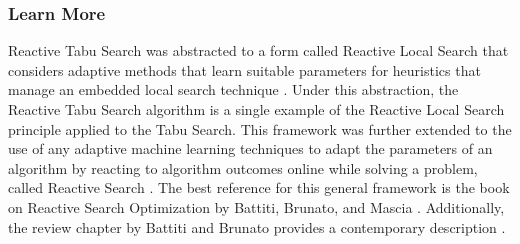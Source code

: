 % 
% 
\subsubsection{Learn More}
Reactive Tabu Search was abstracted to a form called Reactive Local Search that considers adaptive methods that learn suitable parameters for heuristics that manage an embedded local search technique \cite{Battiti1995, Battiti2001}. Under this abstraction, the Reactive Tabu Search algorithm is a single example of the Reactive Local Search principle applied to the Tabu Search. 
This framework was further extended to the use of any adaptive machine learning techniques to adapt the parameters of an algorithm by reacting to algorithm outcomes online while solving a problem, called Reactive Search \cite{Battiti1996}. The best reference for this general framework is the book on Reactive Search Optimization by Battiti, Brunato, and Mascia \cite{Battiti2008}. Additionally, the review chapter by Battiti and Brunato provides a contemporary description \cite{Battiti2009}.


